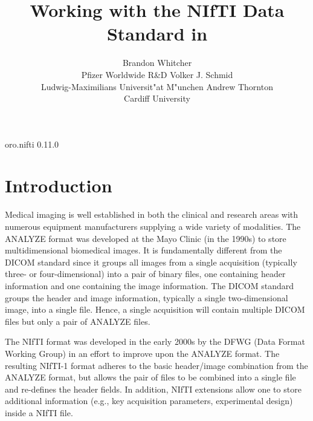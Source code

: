 \documentclass[
]{jss}
\author{
Brandon Whitcher\\Pfizer Worldwide R\&D \And Volker J.
Schmid\\Ludwig-Maximilians Universit"at M"unchen \And Andrew
Thornton\\Cardiff University
}
\title{Working with the NIfTI Data Standard in \proglang{R}}
\begin{document}
\begin{CodeChunk}

\begin{CodeOutput}
oro.nifti 0.11.0
\end{CodeOutput}
\end{CodeChunk}

\hypertarget{introduction}{%
\section{Introduction}\label{introduction}}

Medical imaging is well established in both the clinical and research
areas with numerous equipment manufacturers supplying a wide variety of
modalities. The ANALYZE format was developed at the Mayo Clinic (in the
1990s) to store multidimensional biomedical images. It is fundamentally
different from the DICOM standard since it groups all images from a
single acquisition (typically three- or four-dimensional) into a pair of
binary files, one containing header information and one containing the
image information. The DICOM standard groups the header and image
information, typically a single two-dimensional image, into a single
file. Hence, a single acquisition will contain multiple DICOM files but
only a pair of ANALYZE files.

The NIfTI format was developed in the early 2000s by the DFWG (Data
Format Working Group) in an effort to improve upon the ANALYZE format.
The resulting NIfTI-1 format adheres to the basic header/image
combination from the ANALYZE format, but allows the pair of files to be
combined into a single file and re-defines the header fields. In
addition, NIfTI extensions allow one to store additional information
(e.g., key acquisition parameters, experimental design) inside a NIfTI
file.
\end{document}
